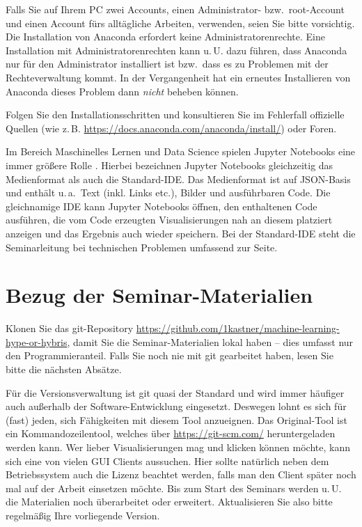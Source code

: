 \documentclass{tufte-handout}
\begin{document}
Falls Sie auf Ihrem PC zwei Accounts, einen Administrator- bzw.\ root-Account und einen Account fürs alltägliche Arbeiten, verwenden, seien Sie bitte vorsichtig.
Die Installation von Anaconda erfordert keine Administratorenrechte.
Eine Installation mit Administratorenrechten kann u.\,U. dazu führen, dass Anaconda nur für den Administrator installiert ist bzw.\ dass es zu Problemen mit der Rechteverwaltung kommt.
In der Vergangenheit hat ein erneutes Installieren von Anaconda dieses Problem dann \emph{nicht} beheben können.

Folgen Sie den Installationsschritten und konsultieren Sie im Fehlerfall offizielle Quellen (wie z.\,B. \url{https://docs.anaconda.com/anaconda/install/}) oder Foren.

Im Bereich Maschinelles Lernen und Data Science spielen Jupyter Notebooks eine immer größere Rolle%
\cite{perkel_why_2018,hiltch_jupyter_2019}.
Hierbei bezeichnen Jupyter Notebooks gleichzeitig das Medienformat als auch die Standard-IDE.
Das Medienformat ist auf JSON-Basis und enthält u.\,a.\ Text (inkl. Links etc.), Bilder und ausführbaren Code.
Die gleichnamige IDE kann Jupyter Notebooks öffnen, den enthaltenen Code ausführen, die vom Code erzeugten Visualisierungen nah an diesem platziert anzeigen und das Ergebnis auch wieder speichern.
Bei der Standard-IDE steht die Seminarleitung bei technischen Problemen umfassend zur Seite.


\section{Bezug der Seminar-Materialien}

Klonen Sie das git-Repository
\url{https://github.com/1kastner/machine-learning-hype-or-hybris},
damit Sie die Seminar-Materialien lokal haben -- dies umfasst nur den Programmieranteil.
Falls Sie noch nie mit git gearbeitet haben, lesen Sie bitte die nächsten Absätze.

Für die Versionsverwaltung ist git quasi der Standard und wird immer häufiger auch außerhalb der Software-Entwicklung eingesetzt.
Deswegen lohnt es sich für (fast) jeden, sich Fähigkeiten mit diesem Tool anzueignen.
Das Original-Tool ist ein Kommandozeilentool, welches über \url{https://git-scm.com/} heruntergeladen werden kann.
Wer lieber Visualisierungen mag und klicken können möchte, kann sich eine von vielen GUI Clients%
aussuchen.
Hier sollte natürlich neben dem Betriebssystem auch die Lizenz beachtet werden, falls man den Client später noch mal auf der Arbeit einsetzen möchte.
Bis zum Start des Seminars werden u.\,U. die Materialien noch überarbeitet oder erweitert.
Aktualisieren Sie also bitte regelmäßig Ihre vorliegende Version.
\end{document}
